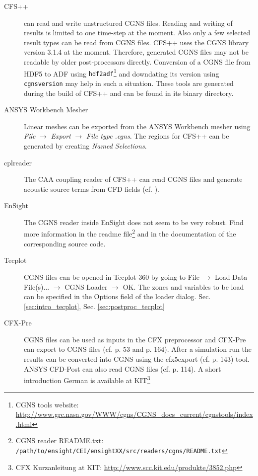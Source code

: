 \begin{description}

\item[CFS++] can read and write  unstructured CGNS files.  Reading and writing
  of  results is  limited to  one time-step  at the  moment. Also  only a  few
  selected result  types can  be read  from CGNS files.   CFS++ uses  the CGNS
  library version 3.1.4 at the moment. Therefore, generated CGNS files may not
  be readable  by older post-processors  directly.  Conversion of a  CGNS file
  from  HDF5   to  ADF   using  {\tt  hdf2adf}\footnote{CGNS   tools  website:
    \url{http://www.grc.nasa.gov/WWW/cgns/CGNS_docs_current/cgnstools/index.html}}
  and  downdating its  version  using {\tt  cgnsversion} may  help  in such  a
  situation. These  tools are generated during  the build of CFS++  and can be
  found in its binary directory.

\item[ANSYS Workbench  Mesher] Linear  meshes can be  exported from  the ANSYS
  Workbench mesher using \emph{File} $\rightarrow$ \emph{Export} $\rightarrow$
  \emph{File type .cgns}.  The regions for CFS++ can be  generated by creating
  \emph{Named Selections}.

\item[cplreader]  The CAA coupling  reader of  CFS++ can  read CGNS  files and
generate acoustic source terms from CFD fields (cf. \cite{cplreadermanual}).

\item[EnSight] The CGNS reader inside EnSight does not seem to be very robust.
Find  more information  in  the readme  file\footnote{CGNS reader  README.txt:
\texttt{  /path/to/ensight/CEI/ensightXX/src/readers/cgns/README.txt}}  and in
the documentation of the corresponding source code.

\item[Tecplot]  CGNS files  can be  opened  in Tecplot  360 by  going to  File
$\rightarrow$  Load Data File(s)...   $\rightarrow$ CGNS  Loader $\rightarrow$
OK. The zones and  variables to be load can be specified  in the Options field
of      the      loader      dialog.       Sec.       \ref{sec:intro_tecplot},
Sec. \ref{sec:postproc_tecplot}

\item[CFX-Pre] CGNS  files can be used  as inputs in the  CFX preprocessor and
CFX-Pre can export to CGNS files (cf.  \cite{CFXPreUG2009} p.  53 and p. 164).
After  a simulation  run the  results  can be  converted into  CGNS using  the
cfx5export (cf. \cite{CFXSolvManUG2009} p. 143) tool.  ANSYS CFD-Post can also
read CGNS  files (cf. \cite{ANSYSCFDPostUG2010} p. 114).  A short introduction
German    is   available   at    KIT\footnote{CFX   Kurzanleitung    at   KIT:
\url{http://www.scc.kit.edu/produkte/3852.php}}


\end{description}

